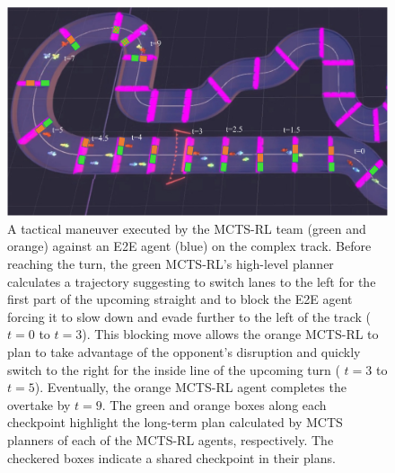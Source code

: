 \begin{figure}
 \centering
  \includegraphics[width=\textwidth]{Figures/MCTSRLTeamBlockToOvertake.pdf}
  \caption[Block to overtake maneuver executed by the team of MCTS-RL agents.]{A tactical maneuver executed by the MCTS-RL team (green and orange) against an E2E agent (blue) on the complex track.  Before reaching the turn, the green MCTS-RL's high-level planner calculates a trajectory suggesting to switch lanes to the left for the first part of the upcoming straight and to block the E2E agent forcing it to slow down and evade further to the left of the track ($t=0$ to $t=3$). This blocking move allows the orange MCTS-RL to plan to take advantage of the opponent's disruption and quickly switch to the right for the inside line of the upcoming turn ( $t=3$ to $t=5$). Eventually, the orange MCTS-RL agent completes the overtake by $t=9$. The green and orange boxes along each checkpoint highlight the long-term plan calculated by MCTS planners of each of the MCTS-RL agents, respectively. The checkered boxes indicate a shared checkpoint in their plans.}
  \label{fig:team_mctsrl:strategy}
\end{figure}
